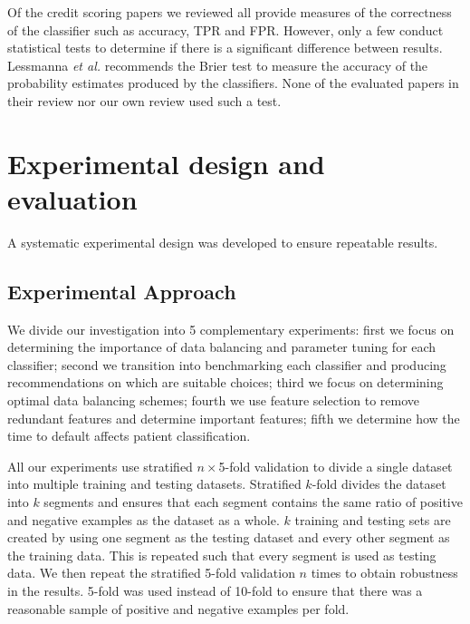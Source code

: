 \documentclass{sig-alternate-05-2015}
\begin{document}
	Of the credit scoring papers we reviewed \cite{Abdou2016, Angelini2008733, Bekhet201420, Danenas20153194, Desai199624, Hsieh2010534, Huang2004543, Huang2007847, Lee2002245, Li2006772, Luo20097562, Malhotra200383, Nanni20093028, Tsai20082639, Twala20103326, Wang2011223} all provide measures of the correctness of the classifier such as accuracy, TPR and FPR. However, only a few \cite{Desai199624, Huang2004543, Malhotra200383, Wang2011223} conduct statistical tests to determine if there is a significant difference between results. Lessmanna \textit{et al.} \cite{lessmanna2013benchmarking} recommends the Brier test to measure the accuracy of the probability estimates produced by the classifiers. None of the evaluated papers in their review nor our own review used such a test.
	
	\section{Experimental design and evaluation}
	A systematic experimental design was developed to ensure repeatable results.
	\subsection{Experimental Approach}
	\label{method-approach}
	We divide our investigation into 5 complementary experiments: first we focus on determining the importance of data balancing and parameter tuning for each classifier; second we transition into benchmarking each classifier and producing recommendations on which are suitable choices; third we focus on determining optimal data balancing schemes; fourth we use feature selection to remove redundant features and determine important features; fifth we determine how the time to default affects patient classification.
	
	All our experiments use stratified $n\times$5-fold validation to divide a single dataset into multiple training and testing datasets. Stratified $k$-fold divides the dataset into $k$ segments and ensures that each segment contains the same ratio of positive and negative examples as the dataset as a whole. $k$ training and testing sets are created by using one segment as the testing dataset and every other segment as the training data. This is repeated such that every segment is used as testing data. We then repeat the stratified 5-fold validation $n$ times to obtain robustness in the results. 5-fold was used instead of 10-fold to ensure that there was a reasonable sample of positive and negative examples per fold.
	
\end{document}
